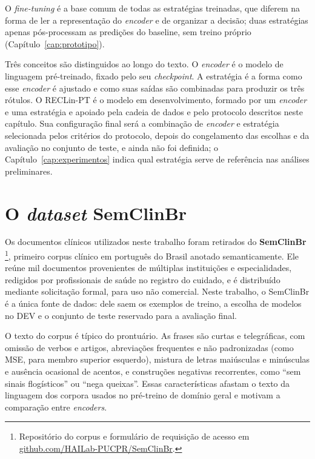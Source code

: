 O \emph{fine-tuning} é a base comum de todas as estratégias treinadas, que diferem na
forma de ler a representação do \emph{encoder} e de organizar a decisão; duas
estratégias apenas pós-processam as predições do baseline, sem treino próprio
(Capítulo~\ref{cap:prototipo}).

Três conceitos são distinguidos ao longo do texto. O \emph{encoder} é o modelo de
linguagem pré-treinado, fixado pelo seu \emph{checkpoint}. A estratégia é a forma
como esse \emph{encoder} é ajustado e como suas saídas são combinadas para produzir
os três rótulos. O RECLin-PT é o modelo em desenvolvimento, formado por um
\emph{encoder} e uma estratégia e apoiado pela cadeia de dados e pelo protocolo
descritos neste capítulo. Sua configuração final será a combinação de
\emph{encoder} e estratégia selecionada pelos critérios do protocolo, depois do
congelamento das escolhas e da avaliação no conjunto de teste, e ainda não foi
definida; o Capítulo~\ref{cap:experimentos} indica qual estratégia serve de
referência nas análises preliminares.

\section{O \emph{dataset} SemClinBr}
\label{sec:corpus}

Os documentos clínicos utilizados neste trabalho foram retirados do
\textbf{SemClinBr} \cite{oliveira_2022_semclinbr}\footnote{Repositório do corpus e
formulário de requisição de acesso em
\href{https://github.com/HAILab-PUCPR/SemClinBr}{github.com/HAILab-PUCPR/SemClinBr}.},
primeiro corpus clínico em português do Brasil anotado semanticamente. Ele reúne mil
documentos provenientes de múltiplas instituições e especialidades, redigidos por
profissionais de saúde no registro do cuidado, e é distribuído mediante solicitação
formal, para uso não comercial. Neste trabalho, o SemClinBr é a única fonte de dados:
dele saem os exemplos de treino, a escolha de modelos no DEV e o conjunto de teste
reservado para a avaliação final.

O texto do corpus é típico do prontuário. As frases são curtas e telegráficas, com
omissão de verbos e artigos, abreviações frequentes e não padronizadas (como MSE,
para membro superior esquerdo), mistura de letras maiúsculas e minúsculas e ausência
ocasional de acentos, e construções negativas recorrentes, como ``sem sinais
flogísticos'' ou ``nega queixas''. Essas características afastam o texto da
linguagem dos corpora usados no pré-treino de domínio geral e motivam a comparação
entre \emph{encoders}.

